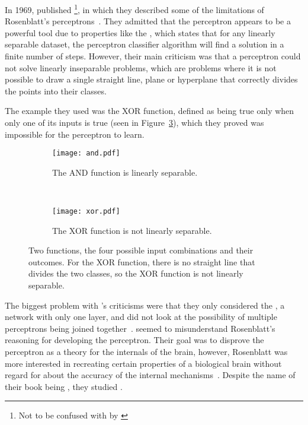 In 1969, \citeauthor{minsky1987} published \footnote{Not to be confused with  by \textcite{rosenblatt1957}}, in which they described some of the limitations of Rosenblatt's perceptrons~\autocite{minsky1987}.
They admitted that the perceptron appears to be a powerful tool due to properties like the , which states that for any linearly separable dataset, the perceptron classifier algorithm will find a solution in a finite number of steps.
However, their main criticism was that a perceptron could not solve linearly inseparable problems, which are problems where it is not possible to draw a single straight line, plane or hyperplane that correctly divides the points into their classes.

The example they used was the XOR function, defined as being true only when only one of its inputs is true (seen in Figure~\ref{xor}), which they proved was impossible for the perceptron to learn.

\begin{figure}[htbp]
 \centering
 \begin{subfigure}[t]{0.45\textwidth}
 \texttt{[image: and.pdf]}
 \caption{The AND function is linearly separable.}
 \label{and}
 \end{subfigure}
 ~ %
 \begin{subfigure}[t]{0.45\textwidth}
 \texttt{[image: xor.pdf]}
 \caption{The XOR function is not linearly separable.}
 \label{xor}
 \end{subfigure}
\caption{Two functions, the four possible input combinations and their outcomes. For the XOR function, there is no straight line that divides the two classes, so the XOR function is not linearly separable.}
\end{figure}

The biggest problem with \citeauthor{minsky1987}'s criticisms were that they only considered the , a network with only one layer, and did not look at the possibility of multiple perceptrons being joined together~\autocite[514]{block1970}.
\citeauthor{minsky1987} seemed to misunderstand Rosenblatt's reasoning for developing the perceptron.
Their goal was to disprove the perceptron as a theory for the internals of the brain, however, Rosenblatt was more interested in recreating certain properties of a biological brain without regard for about the accuracy of the internal mechanisms~\autocite[516]{block1970}.
Despite the name of their book being , they studied .


